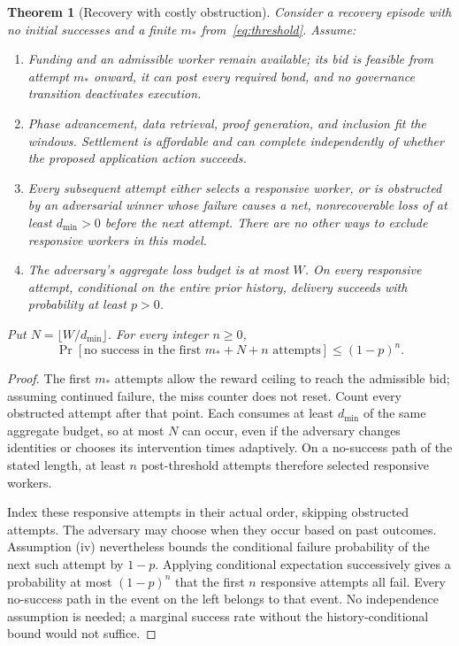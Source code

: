 \documentclass[10pt,letterpaper]{article}
\newtheorem{theorem}{Theorem}
\begin{document}
\begin{theorem}[Recovery with costly obstruction]
\label{thm:live}
Consider a recovery episode with no initial successes and a finite $m_*$ from~\eqref{eq:threshold}. Assume:
\begin{enumerate}[label=(\roman*)]
\item Funding and an admissible worker remain available; its bid is feasible from attempt $m_*$ onward, it can post every required bond, and no governance transition deactivates execution.
\item Phase advancement, data retrieval, proof generation, and inclusion fit the windows. Settlement is affordable and can complete independently of whether the proposed application action succeeds.
\item Every subsequent attempt either selects a responsive worker, or is obstructed by an adversarial winner whose failure causes a net, nonrecoverable loss of at least $d_{\min}>0$ before the next attempt. There are no other ways to exclude responsive workers in this model.
\item The adversary's aggregate loss budget is at most $W$. On every responsive attempt, conditional on the entire prior history, delivery succeeds with probability at least $p>0$.
\end{enumerate}
Put $N=\lfloor W/d_{\min}\rfloor$. For every integer $n\geq0$,
\begin{equation}
 \Pr[\text{no success in the first }m_*+N+n\text{ attempts}]
 \leq (1-p)^n. \label{eq:live}
\end{equation}
\end{theorem}
\begin{proof}
The first $m_*$ attempts allow the reward ceiling to reach the admissible bid; assuming continued failure, the miss counter does not reset. Count every obstructed attempt after that point. Each consumes at least $d_{\min}$ of the same aggregate budget, so at most $N$ can occur, even if the adversary changes identities or chooses its intervention times adaptively. On a no-success path of the stated length, at least $n$ post-threshold attempts therefore selected responsive workers.

Index these responsive attempts in their actual order, skipping obstructed attempts. The adversary may choose when they occur based on past outcomes. Assumption (iv) nevertheless bounds the conditional failure probability of the next such attempt by $1-p$. Applying conditional expectation successively gives a probability at most $(1-p)^n$ that the first $n$ responsive attempts all fail. Every no-success path in the event on the left belongs to that event. No independence assumption is needed; a marginal success rate without the history-conditional bound would not suffice.
\end{proof}
\end{document}
